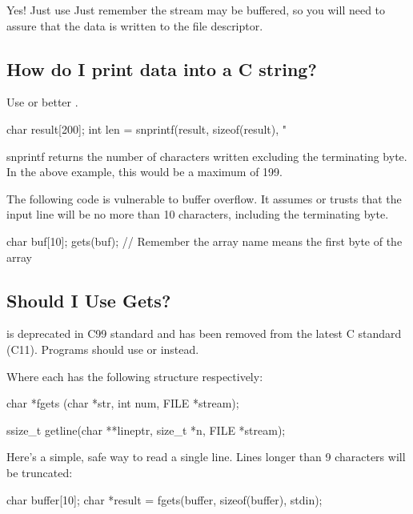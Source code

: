 Yes! Just use 
Just remember the stream may be buffered, so you will need to assure
that the data is written to the file descriptor.

\subsection{How do I print data into a C string?}

Use  or better .

\begin{code}[language=C]
char result[200];
int len = snprintf(result, sizeof(result), "%
\end{code}

snprintf returns the number of characters written excluding the
terminating byte. In the above example, this would be a maximum of 199.

The following code is vulnerable to buffer overflow. It assumes or
trusts that the input line will be no more than 10 characters, including
the terminating byte.

\begin{code}[language=C]
char buf[10];
gets(buf); // Remember the array name means the first byte of the array
\end{code}

\subsection{Should I Use Gets?}

 is deprecated in C99 standard and has been removed from
the latest C standard (C11). Programs should use  or
 instead.

Where each has the following structure respectively:

\begin{code}[language=C]
char *fgets (char *str, int num, FILE *stream); 

ssize_t getline(char **lineptr, size_t *n, FILE *stream);
\end{code}

Here's a simple, safe way to read a single line. Lines longer than 9
characters will be truncated:

\begin{code}[language=C]
char buffer[10];
char *result = fgets(buffer, sizeof(buffer), stdin);
\end{code}

